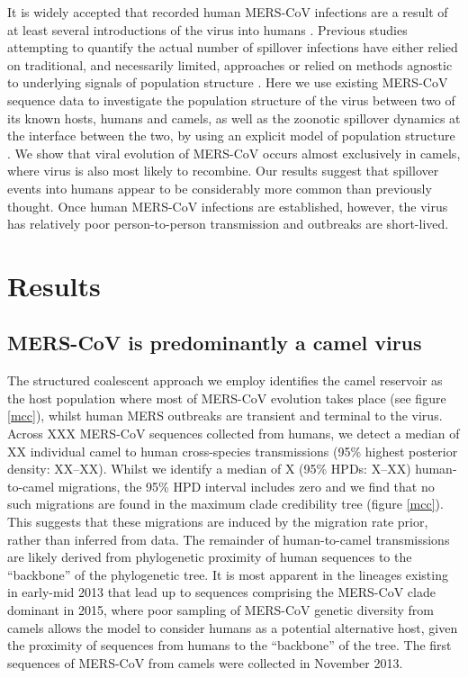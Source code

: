 \documentclass[11pt,oneside,letterpaper]{article}
\begin{document}
It is widely accepted that recorded human MERS-CoV infections are a result of at least several introductions of the virus into humans \citep{cotten_2013}.
Previous studies attempting to quantify the actual number of spillover infections have either relied on traditional, and necessarily limited, approaches \citep{cauchemez_unraveling_2016} or relied on methods agnostic to underlying signals of population structure \citep{zhang_evolutionary_2016}.
Here we use existing MERS-CoV sequence data to investigate the population structure of the virus between two of its known hosts, humans and camels, as well as the zoonotic spillover dynamics at the interface between the two, by using an explicit model of population structure \citep{vaughan_efficient_2014}.
We show that viral evolution of MERS-CoV occurs almost exclusively in camels, where virus is also most likely to recombine.
Our results suggest that spillover events into humans appear to be considerably more common than previously thought.
Once human MERS-CoV infections are established, however, the virus has relatively poor person-to-person transmission and outbreaks are short-lived.
%

\section*{Results}

\subsection*{MERS-CoV is predominantly a camel virus}
The structured coalescent approach we employ \citep{vaughan_efficient_2014} identifies the camel reservoir as the host population where most of MERS-CoV evolution takes place (see figure \ref{mcc}), whilst human MERS outbreaks are transient and terminal to the virus.
Across XXX MERS-CoV sequences collected from humans, we detect a median of XX individual camel to human cross-species transmissions (95\% highest posterior density: XX--XX).
Whilst we identify a median of X (95\% HPDs: X--XX) human-to-camel migrations, the 95\% HPD interval includes zero and we find that no such migrations are found in the maximum clade credibility tree (figure \ref{mcc}).
This suggests that these migrations are induced by the migration rate prior, rather than inferred from data.
The remainder of human-to-camel transmissions are likely derived from phylogenetic proximity of human sequences to the ``backbone'' of the phylogenetic tree.
It is most apparent in the lineages existing in early-mid 2013 that lead up to sequences comprising the MERS-CoV clade dominant in 2015, where poor sampling of MERS-CoV genetic diversity from camels allows the model to consider humans as a potential alternative host, given the proximity of sequences from humans to the ``backbone'' of the tree.
The first sequences of MERS-CoV from camels were collected in November 2013.
\end{document}
